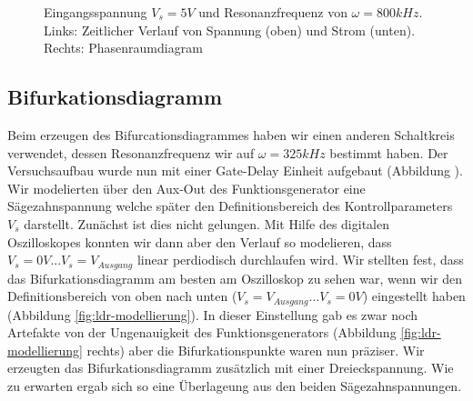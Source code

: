 \documentclass{scrartcl}
\begin{document}
\begin{figure}[!htbp]
\caption{Eingangsspannung $V_s=5V$ und Resonanzfrequenz von $\omega=800kHz$. Links: Zeitlicher Verlauf von Spannung (oben) und Strom (unten). Rechts: Phasenraumdiagram}
\label{fig:ldr-real2}
\end{figure}
\subsection { Bifurkationsdiagramm }
Beim erzeugen des Bifurcationsdiagrammes haben wir einen anderen Schaltkreis verwendet, dessen Resonanzfrequenz wir auf $\omega=325kHz$ bestimmt haben. Der Versuchsaufbau wurde nun mit einer Gate-Delay Einheit aufgebaut (Abbildung \label{fig:ldr-aufbau1}). Wir modelierten über den Aux-Out des Funktionsgenerator eine Sägezahnspannung welche später den Definitionsbereich des Kontrollparameters $V_s$ darstellt. 
Zunächst ist dies nicht gelungen. Mit Hilfe des digitalen Oszilloskopes konnten wir dann aber den Verlauf so modelieren, dass  $V_s=0V...V_s=V_{Ausgang}$ linear perdiodisch durchlaufen wird. 
Wir stellten fest, dass das Bifurkationsdiagramm am besten am Oszilloskop zu sehen war, wenn wir den Definitionsbereich von oben nach unten ($V_s=V_{Ausgang}...V_s=0V$) eingestellt haben (Abbildung \ref{fig:ldr-modellierung}). In dieser Einstellung gab es zwar noch Artefakte von der Ungenauigkeit des Funktionsgenerators (Abbildung \ref{fig:ldr-modellierung} rechts) aber die Bifurkationspunkte waren nun präziser. Wir erzeugten das Bifurkationsdiagramm zusätzlich mit einer Dreieckspannung. Wie zu erwarten ergab sich so eine Überlageung aus den beiden Sägezahnspannungen. 
\end{document}
